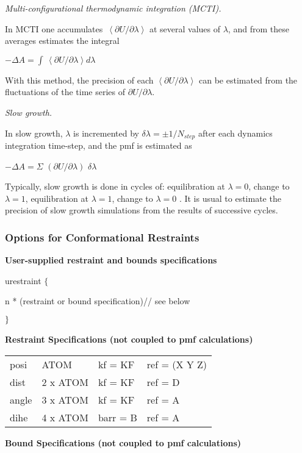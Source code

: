 {\em Multi-configurational thermodynamic integration (MCTI).}

In MCTI one accumulates $\,\left\langle \partial U/\partial \lambda
\right\rangle $ at several values of $\lambda $, and from these averages
estimates the integral

\qquad \qquad \qquad \qquad $-\Delta A=\int \,\left\langle \partial U/
\partial \lambda \right\rangle d\lambda $

With this method, the precision of each $\left\langle \partial U/\partial 
\lambda \right\rangle $ can be estimated from the fluctuations of the time
series of $\partial U/\partial \lambda $.\bigskip 

{\em Slow growth.}

In slow growth, $\lambda $ is incremented by $\delta \lambda =\pm 1/N_{step}$
after each dynamics integration time-step, and the pmf is estimated as

\qquad \qquad \qquad \qquad $-\Delta A=\Sigma $ $\left( \partial U/\partial
\lambda \right) $ $\delta \lambda $

Typically, slow growth is done in cycles of: equilibration at $\lambda =0$,
change to $\lambda =1$, equilibration at $\lambda =1$, change to $\lambda =0$
. It is usual to estimate the precision of slow growth simulations from the
results of successive cycles.

\subsubsection{Options for Conformational Restraints}

{\bf User-supplied restraint and bounds specifications}

\qquad \qquad urestraint $\{$

\qquad \qquad \quad n * (restraint or bound specification)\qquad \qquad //
see below

\qquad \qquad $\}\medskip $

{\bf Restraint Specifications (not coupled to pmf calculations)}

\qquad \qquad 
\begin{tabular}{llll}
posi & ATOM & kf = KF & ref = (X Y Z) \\ 
dist & 2 x ATOM & kf = KF & ref = D \\ 
angle & 3 x ATOM & kf = KF & ref = A \\ 
dihe & 4 x ATOM & barr = B & ref = A
\end{tabular}
\bigskip 

{\bf Bound Specifications (not coupled to pmf calculations)}

